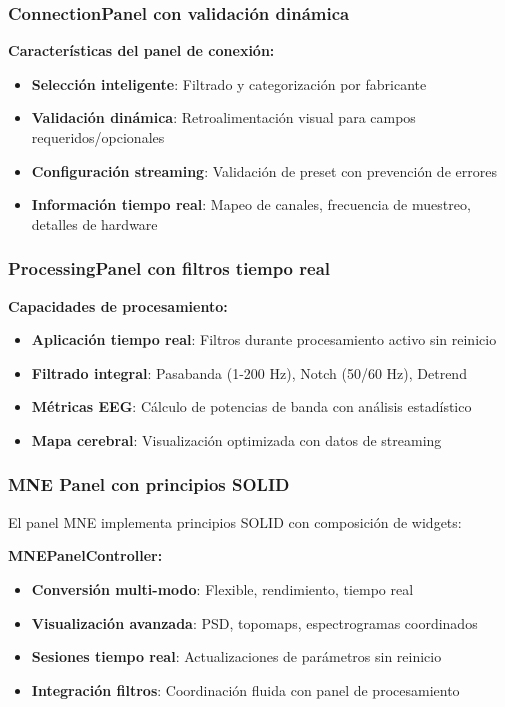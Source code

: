 \subsubsection{ConnectionPanel con validación dinámica}

\textbf{Características del panel de conexión:}
\begin{itemize}
    \item \textbf{Selección inteligente}: Filtrado y categorización por fabricante
    \item \textbf{Validación dinámica}: Retroalimentación visual para campos requeridos/opcionales
    \item \textbf{Configuración streaming}: Validación de preset con prevención de errores
    \item \textbf{Información tiempo real}: Mapeo de canales, frecuencia de muestreo, detalles de hardware
\end{itemize}

\subsubsection{ProcessingPanel con filtros tiempo real}

\textbf{Capacidades de procesamiento:}
\begin{itemize}
    \item \textbf{Aplicación tiempo real}: Filtros durante procesamiento activo sin reinicio
    \item \textbf{Filtrado integral}: Pasabanda (1-200 Hz), Notch (50/60 Hz), Detrend
    \item \textbf{Métricas EEG}: Cálculo de potencias de banda con análisis estadístico
    \item \textbf{Mapa cerebral}: Visualización optimizada con datos de streaming
\end{itemize}

\subsubsection{MNE Panel con principios SOLID}

El panel MNE implementa principios SOLID con composición de widgets:

\textbf{MNEPanelController:}
\begin{itemize}
    \item \textbf{Conversión multi-modo}: Flexible, rendimiento, tiempo real
    \item \textbf{Visualización avanzada}: PSD, topomaps, espectrogramas coordinados
    \item \textbf{Sesiones tiempo real}: Actualizaciones de parámetros sin reinicio
    \item \textbf{Integración filtros}: Coordinación fluida con panel de procesamiento
\end{itemize}

